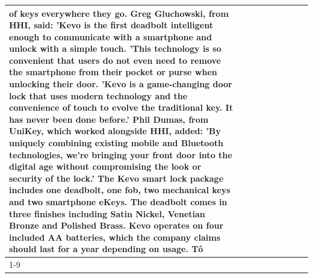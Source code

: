 \begin{table}[H]
\begin{tabular}{lllrlllll}
of keys everywhere they go. Greg Gluchowski, from HHI, said: 'Kevo is the first deadbolt intelligent enough to communicate with a smartphone and unlock with a simple touch. 'This technology is so convenient that users do not even need to remove the smartphone from their pocket or purse when unlocking their door. 'Kevo is a game-changing door lock that uses modern technology and the convenience of touch to evolve the traditional key. It has never been done before.' Phil Dumas, from UniKey, which worked alongside HHI, added: 'By uniquely combining existing mobile and Bluetooth technologies, we’re bringing your front door into the digital age without compromising the look or security of the lock.' The Kevo smart lock package includes one deadbolt, one fob, two mechanical keys and two smartphone eKeys. The deadbolt comes in three finishes including Satin Nickel, Venetian Bronze and Polished Brass. Kevo operates on four included AA batteries, which the company claims should last for a year depending on usage. Tô \\
\cline{1-9}

\end{tabular}
\end{table}
